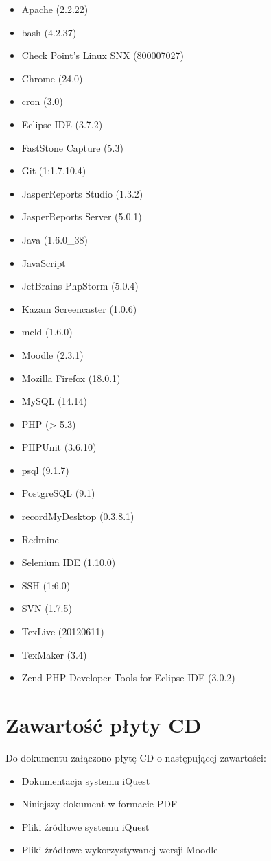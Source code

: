 \begin{itemize}
\item Apache (2.2.22)
\item bash (4.2.37)
\item Check Point's Linux SNX (800007027)
\item Chrome (24.0)
\item cron (3.0)
\item Eclipse IDE (3.7.2)
\item FastStone Capture (5.3)
\item Git (1:1.7.10.4)
\item JasperReports Studio (1.3.2)
\item JasperReports Server (5.0.1)
\item Java (1.6.0\_38)
\item JavaScript
\item JetBrains PhpStorm (5.0.4)
\item Kazam Screencaster (1.0.6)
\item meld (1.6.0)
\item Moodle (2.3.1)
\item Mozilla Firefox (18.0.1)
\item MySQL (14.14)
\item PHP (> 5.3)
\item PHPUnit (3.6.10)
\item psql (9.1.7)
\item PostgreSQL (9.1)
\item recordMyDesktop (0.3.8.1)
\item Redmine
\item Selenium IDE (1.10.0)
\item SSH (1:6.0)
\item SVN (1.7.5)
\item TexLive (20120611)
\item TexMaker (3.4)
\item Zend PHP Developer Tools for Eclipse IDE (3.0.2)
\end{itemize}

\section{Zawartość płyty CD}

Do dokumentu załączono płytę CD o następującej zawartości:

\begin{itemize}
\item Dokumentacja systemu iQuest
\item Niniejszy dokument w formacie PDF
\item Pliki źródłowe systemu iQuest
\item Pliki źródłowe wykorzystywanej wersji Moodle
\end{itemize}